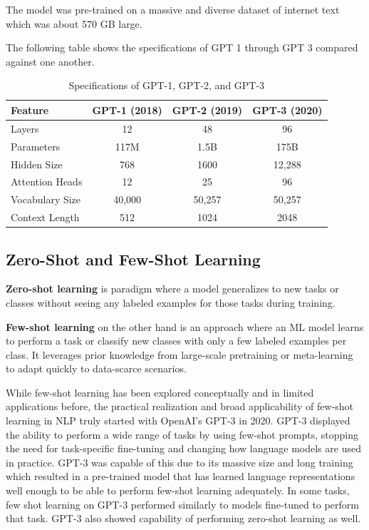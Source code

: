 The model was pre-trained on a massive and diverse dataset of internet text which was about 570 GB large.

The following table shows the specifications of GPT 1 through GPT 3 compared against one another. \\

\begin{table}[H]
\centering
\renewcommand{\arraystretch}{1.5}
\setlength{\tabcolsep}{12pt}
\begin{tabular}{@{}lccc@{}}
\toprule
\textbf{Feature}       & \textbf{GPT-1 (2018)}     & \textbf{GPT-2 (2019)}       & \textbf{GPT-3 (2020)}       \\ \midrule
Layers                 & 12                 & 48                   & 96                   \\
Parameters             & 117M               & 1.5B                 & 175B                 \\
Hidden Size            & 768                & 1600                 & 12,288               \\
Attention Heads        & 12                 & 25                   & 96                   \\
Vocabulary Size        & 40,000             & 50,257               & 50,257               \\
Context Length         & 512                & 1024                 & 2048                 \\ \bottomrule
\end{tabular}
\caption{Specifications of GPT-1, GPT-2, and GPT-3}
\label{tab:gpt_specs}
\end{table}


\subsection{Zero-Shot and Few-Shot Learning}
\textbf{Zero-shot learning} is paradigm where a model generalizes to new tasks or classes without seeing any labeled examples for those tasks during training.

\textbf{Few-shot learning} on the other hand is an approach where an ML model learns to perform a task or classify new classes with only a few labeled examples per class. It leverages prior knowledge from large-scale pretraining or meta-learning to adapt quickly to data-scarce scenarios.

While few-shot learning has been explored conceptually and in limited applications before, the practical realization and broad applicability of few-shot learning in NLP truly started with OpenAI's GPT-3 in 2020. GPT-3 displayed the ability to perform a wide range of tasks by using few-shot prompts, stopping the need for task-specific fine-tuning and changing how language models are used in practice. GPT-3 was capable of this due to its massive size and long training which resulted in a pre-trained model that has learned language representations well enough to be able to perform few-shot learning adequately. In some tasks, few shot learning on GPT-3 performed similarly to models fine-tuned to perform that task. GPT-3 also showed capability of performing zero-shot learning as well.

